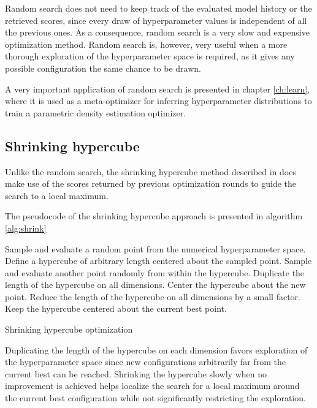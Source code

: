 Random search does not need to keep track of the evaluated model history or the retrieved scores,
since every draw of hyperparameter values is independent of all the previous ones. As a consequence,
random search is a very slow and expensive optimization method. Random search is, however, very
useful when a more thorough exploration of the hyperparameter space is required, as it gives any
possible configuration the same chance to be drawn.

A very important application of random search is presented in chapter \ref{ch:learn}, where it is
used as a meta-optimizer for inferring hyperparameter distributions to train a parametric density
estimation optimizer.

\subsection{Shrinking hypercube}

Unlike the random search, the shrinking hypercube method described in \cite{Gonnet2010} does make
use of the scores returned by previous optimization rounds to guide the search to a local maximum.

The pseudocode of the shrinking hypercube approach is presented in algorithm \ref{alg:shrink}

\begin{algorithm}[here]
	\begin{algorithmic}
		\State Sample and evaluate a random point from the numerical hyperparameter space.
		\State Define a hypercube of arbitrary length centered about the sampled point.
		\State Sample and evaluate another point randomly from within the hypercube.
			\State Duplicate the length of the hypercube on all dimensions.
			\State Center the hypercube about the new point.
		\Else
			\State Reduce the length of the hypercube on all dimensions by a small factor.
			\State Keep the hypercube centered about the current best point.
		\EndIf
		\EndWhile
	\end{algorithmic}
	\caption{Shrinking hypercube optimization}
	\label{alg:shrink}
\end{algorithm}

Duplicating the length of the hypercube on each dimension favors exploration of the
hyperparameter space since new configurations arbitrarily far from the current best can be reached.
Shrinking the hypercube slowly when no improvement is achieved helps localize the search for a local
maximum around the current best configuration while not significantly restricting the exploration.


